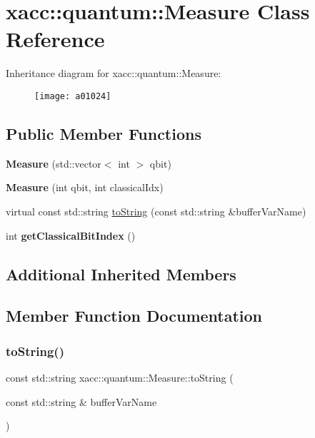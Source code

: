 \hypertarget{a01024}{}\section{xacc\+:\+:quantum\+:\+:Measure Class Reference}
\label{a01024}
Inheritance diagram for xacc\+:\+:quantum\+:\+:Measure\+:\begin{figure}[H]
\begin{center}
\leavevmode
\texttt{[image: a01024]}
\end{center}
\end{figure}
\subsection*{Public Member Functions}
\begin{DoxyCompactItemize}
\item 
\mbox{\label{a01024_afe330a0eea029d842ff9c88a817dcc7d}} 
{\bfseries Measure} (std\+::vector$<$ int $>$ qbit)
\item 
\mbox{\label{a01024_a9b8d9edca8ad2c3fb132780200f17335}} 
{\bfseries Measure} (int qbit, int classical\+Idx)
\item 
virtual const std\+::string \hyperlink{a01024_a1c51a5d68294dcb2ba1a9fbea63a730f}{to\+String} (const std\+::string \&buffer\+Var\+Name)
\item 
\mbox{\label{a01024_a0cb3c94731544042807236ade36fddd0}} 
int {\bfseries get\+Classical\+Bit\+Index} ()
\end{DoxyCompactItemize}
\subsection*{Additional Inherited Members}


\subsection{Member Function Documentation}
\mbox{\label{a01024_a1c51a5d68294dcb2ba1a9fbea63a730f}} 
\subsubsection{\texorpdfstring{to\+String()}{toString()}}
{\footnotesize\ttfamily const std\+::string xacc\+::quantum\+::\+Measure\+::to\+String (\begin{DoxyParamCaption}\item[{const std\+::string \&}]{buffer\+Var\+Name }\end{DoxyParamCaption})\hspace{0.3cm}{\ttfamily [virtual]}}


